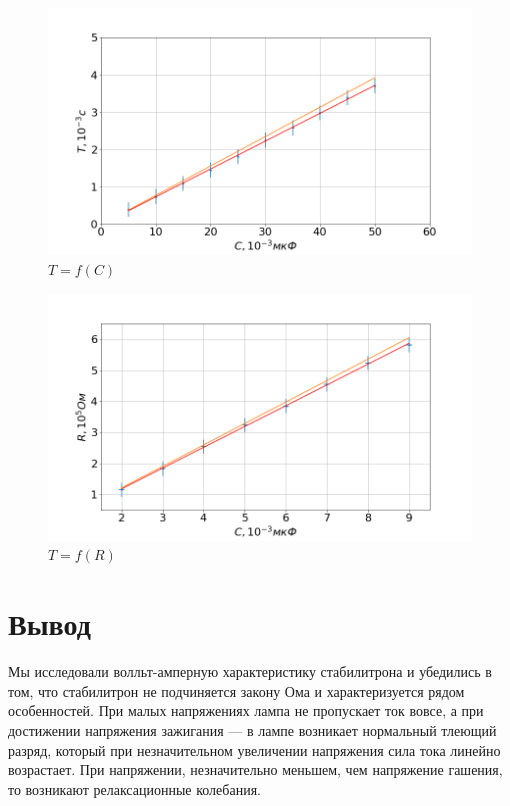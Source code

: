\documentclass[a4paper, fontsize=14pt]{article}
\begin{document}
\begin{figure}[H]
		\includegraphics[width = 1.0\linewidth]{2.png}
		\caption{$T = f(C)$}
	\end{figure}
	\begin{figure}[H]
		\includegraphics[width = 1.0\linewidth]{3.png}
		\caption{$T = f(R)$}
	\end{figure}
\section*{Вывод}
Мы исследовали волльт-амперную характеристику стабилитрона и убедились в том, что стабилитрон не подчиняется закону Ома и характеризуется рядом особенностей. При малых напряжениях лампа не пропускает ток вовсе, а при достижении напряжения зажигания --- в лампе возникает нормальный тлеющий разряд, который при незначительном увеличении напряжения сила тока линейно возрастает. При напряжении, незначительно меньшем, чем напряжение гашения, то возникают релаксационные колебания.
\end{document}
